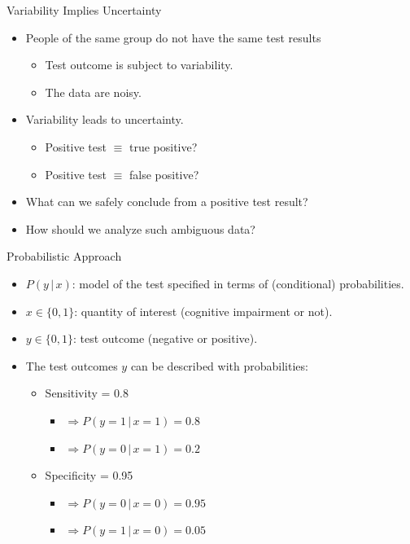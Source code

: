 \documentclass{beamer}
\begin{document}
\begin{frame}{Variability Implies Uncertainty}
\begin{itemize}
\item People of the same group do not have the same test results
  \begin{itemize}
  \item Test outcome is subject to variability.
  \item The data are noisy.
  \end{itemize}
\item Variability leads to uncertainty.
  \begin{itemize}
  \item Positive test $\equiv$ true positive?
  \item Positive test $\equiv$ false positive?
  \end{itemize}
\item What can we safely conclude from a positive test result?
\item How should we analyze such ambiguous data?
\end{itemize}
\end{frame}

\begin{frame}{Probabilistic Approach}
  \begin{itemize}
  \item $P(y\,|\,x)$: model of the test specified in terms of (conditional) probabilities.
  \item $x \in \{0, 1\}$: quantity of interest (cognitive impairment or not).
  \item $y \in \{0, 1\}$: test outcome (negative or positive).
  \item The test outcomes $y$ can be described with probabilities:
  \begin{itemize}
  \item Sensitivity = 0.8
    \begin{itemize}
    \item $\Rightarrow P(y = 1\,|\,x = 1) = 0.8$
    \item $\Rightarrow P(y = 0\,|\,x = 1) = 0.2$
    \end{itemize}
  \item Specificity = 0.95
    \begin{itemize}
    \item $\Rightarrow P(y = 0\,|\,x = 0) = 0.95$
    \item $\Rightarrow P(y = 1\,|\,x = 0) = 0.05$
    \end{itemize}
  \end{itemize}
\end{itemize}
\end{frame}
\end{document}
